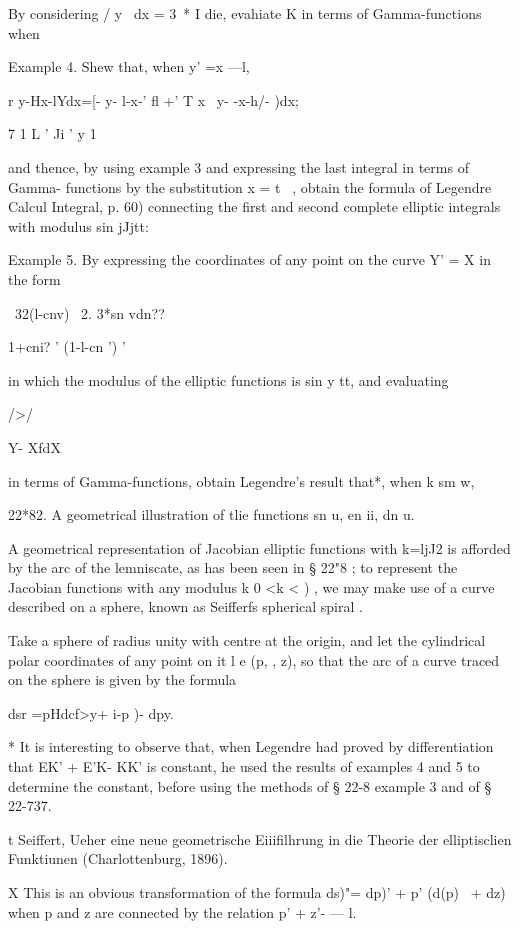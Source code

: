 By considering / y~ dx = 3~* I die, evahiate K in terms of
Gamma-functions when

Example 4. Shew that, when y' =x —l,

r y-Hx-lYdx=[- y- l-x-' fl +' T x~ y- -x-h/- )dx;

7 1 L ' Ji ' y 1

and thence, by using example 3 and expressing the last integral in
terms of Gamma- functions by the substitution x = t~ , obtain the
formula of Legendre Calcul Integral, p. 60) connecting the first and
second complete elliptic integrals with modulus sin jJjtt:

Example 5. By expressing the coordinates of any point on the curve Y'
= X in the form

 \ 32(l-cnv) \ 2. 3*sn vdn??

1+cni? ' (1-l-cn ') '

in which the modulus of the elliptic functions is sin y tt, and
evaluating

 />/

Y- XfdX

in terms of Gamma-functions, obtain Legendre's result that*, when k sm
w,

22*82. A geometrical illustration of tlie functions sn u, en ii, dn u.

A geometrical representation of Jacobian elliptic functions with
k=ljJ2 is afforded by the arc of the lemniscate, as has been seen in §
22"8 ; to represent the Jacobian functions with any modulus k 0 <k < )
, we may make use of a curve described on a sphere, known as Seifferfs
spherical spiral .

Take a sphere of radius unity with centre at the origin, and let the
cylindrical polar coordinates of any point on it l e (p, , z), so that
the arc of a curve traced on the sphere is given by the formula \

 dsr =pHdcf>y+ i-p )- dpy.

* It is interesting to observe that, when Legendre had proved by
differentiation that EK' + E'K- KK' is constant, he used the results
of examples 4 and 5 to determine the constant, before using the
methods of § 22-8 example 3 and of § 22-737.

t Seiffert, Ueher eine neue geometrische Eiiifilhrung in die Theorie
der elliptisclien Funktiunen (Charlottenburg, 1896).

X This is an obvious transformation of the formula ds)"= dp)' + p'
(d(p)~ + dz) when p and z are connected by the relation p' + z'- — l.

